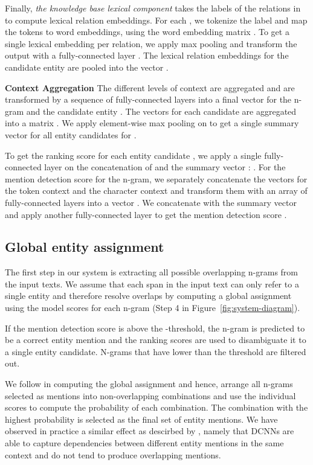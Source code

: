 \documentclass[11pt,a4paper]{article}
\begin{document}
Finally, \textit{the knowledge base lexical component} takes the labels of the relations in  to compute lexical relation embeddings. For each , we tokenize the label and map the tokens  to word embeddings, using the word embedding matrix . To get a single lexical embedding per relation, we apply max pooling and transform the output with a fully-connected layer . The lexical relation embeddings for the candidate entity are pooled into the vector .

\textbf{Context Aggregation} The different levels of context are aggregated and are transformed by a sequence of fully-connected layers into a final vector  for the n-gram  and the candidate entity .
The vectors for each candidate are aggregated into a matrix . We apply element-wise max pooling on  to get a single summary vector  for all entity candidates for . 

To get the ranking score  for each entity candidate , we apply a single fully-connected layer  on the concatenation of  and the summary vector : .
For the mention detection score for the n-gram, we separately concatenate the vectors for the token context  and the character context  and transform them with an array of fully-connected layers into a vector . We concatenate  with the summary vector  and apply another fully-connected layer to get the mention detection score .

\subsection{Global entity assignment}

The first step in our system is extracting all possible overlapping n-grams from the input texts. We assume that each span in the input text can only refer to a single entity and therefore resolve overlaps by computing a global assignment using the model scores for each n-gram (Step 4 in Figure~\ref{fig:system-diagram}). 

If the mention detection score  is above the -threshold, the n-gram is predicted to be a correct entity mention and the ranking scores  are used to disambiguate it to a single entity candidate. N-grams that have  lower than the threshold are filtered out.

We follow \citet{Guo2013b} in computing the global assignment and hence, arrange all n-grams selected as mentions into non-overlapping combinations and use the individual scores  to compute the probability of each combination. The combination with the highest probability is selected as the final set of entity mentions. We have observed in practice a similar effect as descirbed by \citet{Strubell2017}, namely that DCNNs are able to capture dependencies between different entity mentions in the same context and do not tend to produce overlapping mentions.
\end{document}
